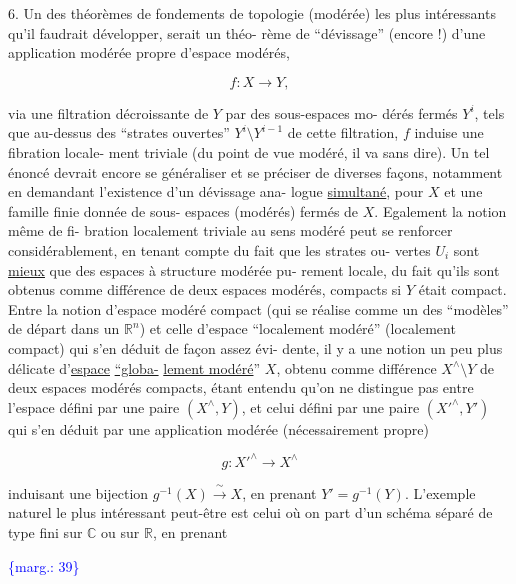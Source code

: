 \documentclass[11pt]{article}
\newcommand{\scanpage}[1]{\par\bigskip\noindent{\small\sffamily[scan #1]}\par}
\newcommand{\mspage}[1]{{\small\sffamily[p.\,#1]}}
\newcommand{\margin}[1]{\textcolor{blue}{\{\textsf{marg.:} #1\}}}
\newcommand{\uline}[1]{\underline{#1}}
\begin{document}
6. Un des théorèmes de fondements de topologie (modérée)
les plus intéressants qu'il faudrait développer, serait un théo-%
rème de ``dévissage'' (encore !) d'une application modérée propre
d'espace modérés,

\[ f : X \longrightarrow Y , \]

via une filtration décroissante de $Y$ par des sous-espaces mo-%
dérés fermés $Y^{i}$, tels que au-dessus des ``strates ouvertes''
$Y^{i} \setminus Y^{i-1}$ de cette filtration, $f$ induise une fibration locale-%
ment triviale (du point de vue modéré, il va sans dire). Un tel
énoncé devrait encore se généraliser et se préciser de diverses
façons, notamment en demandant l'existence d'un dévissage ana-%
logue \uline{simultané}, pour $X$ et une famille finie donnée de sous-%
espaces (modérés) fermés de $X$. Egalement la notion même de fi-%
bration localement triviale au sens modéré peut se renforcer
considérablement, en tenant compte du fait que les strates ou-%
vertes $U_{i}$ sont \uline{mieux} que des espaces à structure modérée pu-%
rement locale, du fait qu'ils sont obtenus comme différence de
deux espaces modérés, compacts si $Y$ était compact. Entre la
notion d'espace modéré compact (qui se réalise comme un des
``modèles'' de départ dans un $\mathbb{R}^{n}$) et celle d'espace ``localement
modéré'' (localement compact) qui s'en déduit de façon assez évi-%
dente, il y a une notion un peu plus délicate d'\uline{espace} \uline{``globa-}%
\uline{lement modéré}'' $X$, obtenu comme différence $X^{\wedge}\setminus Y$ de deux espaces
modérés compacts, étant entendu qu'on ne distingue pas entre
l'espace défini par une paire $(X^{\wedge},Y)$, et celui défini par une
paire $(X'^{\wedge},Y')$ qui s'en déduit par une application modérée
(nécessairement propre)

\[ g : X'^{\wedge} \longrightarrow X^{\wedge} \]

induisant une bijection $g^{-1}(X) \xrightarrow{\ \sim\ } X$, en prenant $Y' = g^{-1}(Y)$.
L'exemple naturel le plus intéressant peut-être est celui où on
part d'un schéma séparé de type fini sur $\mathbb{C}$ ou sur $\mathbb{R}$, en prenant

\margin{39}

\clearpage
\scanpage{119/40}
\mspage{38}
\end{document}
